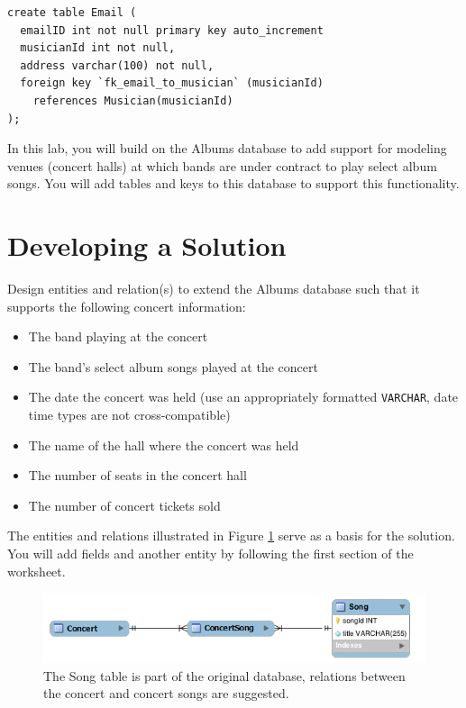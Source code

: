 \documentclass[12pt]{scrartcl}
\begin{document}
\begin{verbatim}
create table Email (
  emailID int not null primary key auto_increment
  musicianId int not null,
  address varchar(100) not null,
  foreign key `fk_email_to_musician` (musicianId) 
    references Musician(musicianId)
);
\end{verbatim}

In this lab, you will build on the Albums database to add support 
for modeling venues (concert halls) at which bands are under 
contract to play select album songs. You will add tables and keys 
to this database to support this functionality.

\section*{Developing a Solution}

Design entities and relation(s) to extend the Albums database such 
that it supports the following concert information:

\begin{itemize}
  \item The band playing at the concert
  \item The band's select album songs played at the concert
  \item The date the concert was held (use an appropriately formatted 
    \texttt{VARCHAR}, date time types are not 
    cross-compatible) 
  \item The name of the hall where the concert was held
  \item The number of seats in the concert hall
  \item The number of concert tickets sold
\end{itemize}

The entities and relations illustrated in Figure \ref{figure:hint} serve as a 
basis for the solution. You will add fields and another entity 
by following the first section of the worksheet.
 
\begin{figure}[h]
\centering
\includegraphics[scale=.50]{images/hint}
\caption{The Song table is part of the original database, relations
between the concert and concert songs are suggested.}
\label{figure:hint}
\end{figure}
\end{document}
